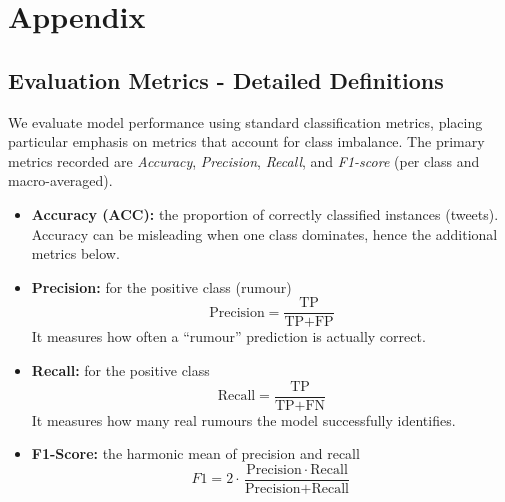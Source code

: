 \documentclass{cshonours}
\begin{document}


\clearpage            %
\appendix             %
\chapter*{Appendix}   %
\section{Evaluation Metrics - Detailed Definitions}
\label{app:metrics}

We evaluate model performance using standard classification metrics, placing particular emphasis on metrics that account for class imbalance.  
The primary metrics recorded are \emph{Accuracy}, \emph{Precision}, \emph{Recall}, and \emph{F1-score} (per class and macro-averaged).

\begin{itemize}
  \item \textbf{Accuracy (ACC):} the proportion of correctly classified instances (tweets).
        Accuracy can be misleading when one class dominates, hence the additional metrics below.

  \item \textbf{Precision:} for the positive class (rumour)  
        \[
          \text{Precision}=\frac{\text{TP}}{\text{TP}+\text{FP}}
        \]
        It measures how often a ``rumour'' prediction is actually correct.

  \item \textbf{Recall:} for the positive class  
        \[
          \text{Recall}=\frac{\text{TP}}{\text{TP}+\text{FN}}
        \]
        It measures how many real rumours the model successfully identifies.

  \item \textbf{F1-Score:} the harmonic mean of precision and recall  
        \[
          F1 = 2 \cdot \frac{\text{Precision}\,\cdot\,\text{Recall}}
                     {\text{Precision} + \text{Recall}}
        \]
\end{itemize}
\end{document}
